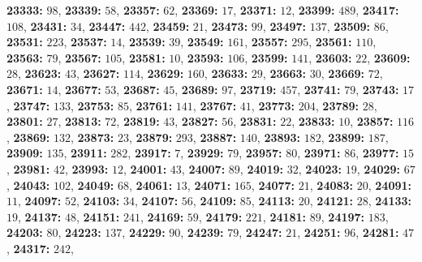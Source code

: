 \textsf{\bfseries 23333:} $98$, \textsf{\bfseries 23339:} $58$, \textsf{\bfseries 23357:} $62$, \textsf{\bfseries 23369:} $17$, \textsf{\bfseries 23371:} $12$, \textsf{\bfseries 23399:} $489$, \textsf{\bfseries 23417:} $108$, \textsf{\bfseries 23431:} $34$, \textsf{\bfseries 23447:} $442$, \textsf{\bfseries 23459:} $21$, \textsf{\bfseries 23473:} $99$, \textsf{\bfseries 23497:} $137$, \textsf{\bfseries 23509:} $86$, \textsf{\bfseries 23531:} $223$, \textsf{\bfseries 23537:} $14$, \textsf{\bfseries 23539:} $39$, \textsf{\bfseries 23549:} $161$, \textsf{\bfseries 23557:} $295$, \textsf{\bfseries 23561:} $110$, \textsf{\bfseries 23563:} $79$, \textsf{\bfseries 23567:} $105$, \textsf{\bfseries 23581:} $10$, \textsf{\bfseries 23593:} $106$, \textsf{\bfseries 23599:} $141$, \textsf{\bfseries 23603:} $22$, \textsf{\bfseries 23609:} $28$, \textsf{\bfseries 23623:} $43$, \textsf{\bfseries 23627:} $114$, \textsf{\bfseries 23629:} $160$, \textsf{\bfseries 23633:} $29$, \textsf{\bfseries 23663:} $30$, \textsf{\bfseries 23669:} $72$, \textsf{\bfseries 23671:} $14$, \textsf{\bfseries 23677:} $53$, \textsf{\bfseries 23687:} $45$, \textsf{\bfseries 23689:} $97$, \textsf{\bfseries 23719:} $457$, \textsf{\bfseries 23741:} $79$, \textsf{\bfseries 23743:} $17$, \textsf{\bfseries 23747:} $133$, \textsf{\bfseries 23753:} $85$, \textsf{\bfseries 23761:} $141$, \textsf{\bfseries 23767:} $41$, \textsf{\bfseries 23773:} $204$, \textsf{\bfseries 23789:} $28$, \textsf{\bfseries 23801:} $27$, \textsf{\bfseries 23813:} $72$, \textsf{\bfseries 23819:} $43$, \textsf{\bfseries 23827:} $56$, \textsf{\bfseries 23831:} $22$, \textsf{\bfseries 23833:} $10$, \textsf{\bfseries 23857:} $116$, \textsf{\bfseries 23869:} $132$, \textsf{\bfseries 23873:} $23$, \textsf{\bfseries 23879:} $293$, \textsf{\bfseries 23887:} $140$, \textsf{\bfseries 23893:} $182$, \textsf{\bfseries 23899:} $187$, \textsf{\bfseries 23909:} $135$, \textsf{\bfseries 23911:} $282$, \textsf{\bfseries 23917:} $7$, \textsf{\bfseries 23929:} $79$, \textsf{\bfseries 23957:} $80$, \textsf{\bfseries 23971:} $86$, \textsf{\bfseries 23977:} $15$, \textsf{\bfseries 23981:} $42$, \textsf{\bfseries 23993:} $12$, \textsf{\bfseries 24001:} $43$, \textsf{\bfseries 24007:} $89$, \textsf{\bfseries 24019:} $32$, \textsf{\bfseries 24023:} $19$, \textsf{\bfseries 24029:} $67$, \textsf{\bfseries 24043:} $102$, \textsf{\bfseries 24049:} $68$, \textsf{\bfseries 24061:} $13$, \textsf{\bfseries 24071:} $165$, \textsf{\bfseries 24077:} $21$, \textsf{\bfseries 24083:} $20$, \textsf{\bfseries 24091:} $11$, \textsf{\bfseries 24097:} $52$, \textsf{\bfseries 24103:} $34$, \textsf{\bfseries 24107:} $56$, \textsf{\bfseries 24109:} $85$, \textsf{\bfseries 24113:} $20$, \textsf{\bfseries 24121:} $28$, \textsf{\bfseries 24133:} $19$, \textsf{\bfseries 24137:} $48$, \textsf{\bfseries 24151:} $241$, \textsf{\bfseries 24169:} $59$, \textsf{\bfseries 24179:} $221$, \textsf{\bfseries 24181:} $89$, \textsf{\bfseries 24197:} $183$, \textsf{\bfseries 24203:} $80$, \textsf{\bfseries 24223:} $137$, \textsf{\bfseries 24229:} $90$, \textsf{\bfseries 24239:} $79$, \textsf{\bfseries 24247:} $21$, \textsf{\bfseries 24251:} $96$, \textsf{\bfseries 24281:} $47$, \textsf{\bfseries 24317:} $242$, 
